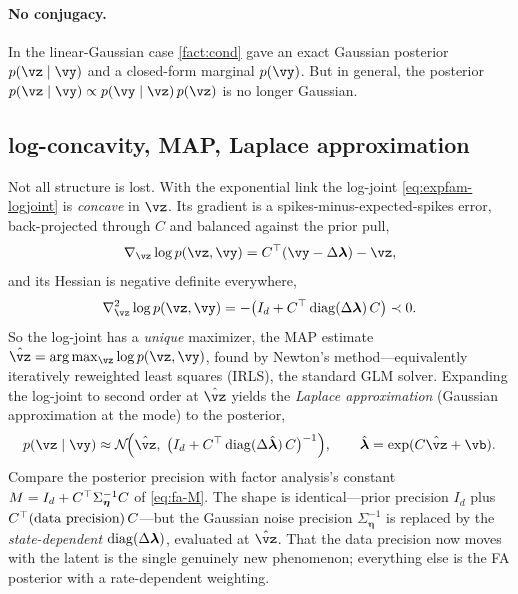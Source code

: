 \documentclass[11pt]{article}
\theoremstyle{plain}
\theoremstyle{definition}
\theoremstyle{remark}
\theoremstyle{definition}
\newcommand{\veta}{\bm{\eta}}
\newcommand{\Normal}{\mathcal{N}}
\begin{document}
\paragraph{No conjugacy.}
In the linear-Gaussian case \cref{fact:cond} gave an exact Gaussian
posterior $p(\vz\mid\vy)$ and a closed-form marginal $p(\vy)$.
But in general, the posterior $p(\vz\mid\vy) \propto p(\vy\mid\vz)\,p(\vz)$
is no longer Gaussian.

\subsection{log-concavity, MAP, Laplace approximation}

Not all structure is lost. With the exponential link the log-joint
\eqref{eq:expfam-logjoint} is \emph{concave} in $\vz$. Its gradient is a
spikes-minus-expected-spikes error, back-projected through $C$ and balanced
against the prior pull,
\begin{equation}\label{eq:expfam-grad}
    \nabla_{\vz}\log p(\vz, \vy) = C\trp(\vy - \Delta\bm{\lambda}) - \vz ,
\end{equation}
and its Hessian is negative definite everywhere,
\begin{equation}\label{eq:expfam-hess}
    \nabla^2_{\vz}\log p(\vz, \vy) = -\big(I_d + C\trp \diag(\Delta\bm{\lambda})\,C\big) \prec 0 .
\end{equation}
So the log-joint has a \emph{unique} maximizer, the MAP estimate $\hat{\vz} =
\arg\max_{\vz}\log p(\vz,\vy)$, found by Newton's method---equivalently
iteratively reweighted least squares (IRLS), the standard GLM solver. Expanding
the log-joint to second order at $\hat{\vz}$ yields the
\emph{Laplace approximation} (Gaussian approximation at the mode) to the posterior,
\begin{equation}\label{eq:expfam-laplace}
    p(\vz \mid \vy) \approx \Normal\!\Big(\hat{\vz},\;
        \big(I_d + C\trp \diag(\Delta\hat{\bm{\lambda}})\,C\big)^{-1}\Big),
    \qquad \hat{\bm{\lambda}} = \exp(C\hat{\vz} + \vb) .
\end{equation}
Compare the posterior precision with factor analysis's constant $M = I_d + C\trp
\Sigma_{\veta}^{-1} C$ of \eqref{eq:fa-M}. The shape is identical---prior
precision $I_d$ plus $C{^\top}(\text{data precision})\,C$---but the Gaussian noise
precision $\Sigma_{\veta}^{-1}$ is replaced by the \emph{state-dependent}
$\operatorname{diag}(\Delta\bm{\lambda})$, evaluated at $\hat{\vz}$. That the data precision now
moves with the latent is the single genuinely new phenomenon; everything else is
the FA posterior with a rate-dependent weighting.
\end{document}
